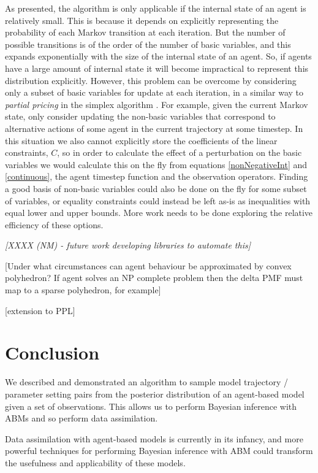 \documentclass{article}
\begin{document}
As presented, the algorithm is only applicable if the internal state of an agent is relatively small. This is because it depends on explicitly representing the probability of each Markov transition at each iteration. But the number of possible transitions is of the order of the number of basic variables, and this expands exponentially with the size of the internal state of an agent. So, if agents have a large amount of internal state it will become impractical to represent this distribution explicitly. However, this problem can be overcome by considering only a subset of basic variables for update at each iteration, in a similar way to \textit{partial pricing} in the simplex algorithm \citep{maros2002computational}. For example, given the current Markov state, only consider updating the non-basic variables that correspond to alternative actions of some agent in the current trajectory at some timestep. In this situation we also cannot explicitly store the coefficients of the linear constraints, $C$, so in order to calculate the effect of a perturbation on the basic variables we would calculate this on the fly from equations \eqref{nonNegativeInt} and \eqref{continuous}, the agent timestep function and the observation operators. Finding a good basis of non-basic variables could also be done on the fly for some subset of variables, or equality constraints could instead be left as-is as inequalities with equal lower and upper bounds. More work needs to be done exploring the relative efficiency of these options.

\textit{[XXXX (NM) - future work developing libraries to automate this]}

[Under what circumstances can agent behaviour be approximated by convex polyhedron? If agent solves an NP complete problem then the delta PMF must map to a sparse polyhedron, for example]

[extension to PPL]

\section{Conclusion}\label{sec:conclusion}

We described and demonstrated an algorithm to sample model trajectory / parameter setting pairs from the posterior distribution of an agent-based model given a set of observations. This allows us to  perform Bayesian inference with ABMs and so perform data assimilation.

Data assimilation with agent-based models is currently in its infancy, and more powerful techniques for performing Bayesian inference with ABM could transform the usefulness and applicability of these models.
\end{document}
